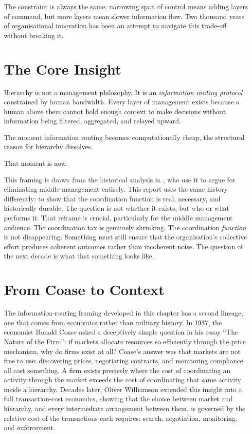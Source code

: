 The constraint is always the same: narrowing span of control means adding layers of command, but more layers mean slower information flow. Two thousand years of organisational innovation has been an attempt to navigate this trade-off without breaking it.

\section{The Core Insight}

\begin{keyinsight}[title={The Structural Argument}]
Hierarchy is not a management philosophy. It is an \emph{information routing protocol} constrained by human bandwidth. Every layer of management exists because a human above them cannot hold enough context to make decisions without information being filtered, aggregated, and relayed upward.

The moment information routing becomes computationally cheap, the structural reason for hierarchy dissolves.

That moment is now.
\end{keyinsight}

This framing is drawn from the historical analysis in \textcite{DorseyBotha2026}, who use it to argue for eliminating middle management entirely. This report uses the same history differently: to show that the coordination function is real, necessary, and historically durable. The question is not whether it exists, but who or what performs it. That reframe is crucial, particularly for the middle management audience. The coordination tax is genuinely shrinking. The coordination \emph{function} is not disappearing. Something must still ensure that the organisation's collective effort produces coherent outcomes rather than incoherent noise. The question of the next decade is what that something looks like.

\section{From Coase to Context}

The information-routing framing developed in this chapter has a second lineage, one that comes from economics rather than military history. In 1937, the economist Ronald Coase asked a deceptively simple question in his essay ``The Nature of the Firm'': if markets allocate resources so efficiently through the price mechanism, why do firms exist at all? Coase's answer was that markets are not free to use: discovering prices, negotiating contracts, and monitoring compliance all cost something. A firm exists precisely where the cost of coordinating an activity through the market exceeds the cost of coordinating that same activity inside a hierarchy. Decades later, Oliver Williamson extended this insight into a full transaction-cost economics, showing that the choice between market and hierarchy, and every intermediate arrangement between them, is governed by the relative cost of the transactions each requires: search, negotiation, monitoring, and enforcement.

